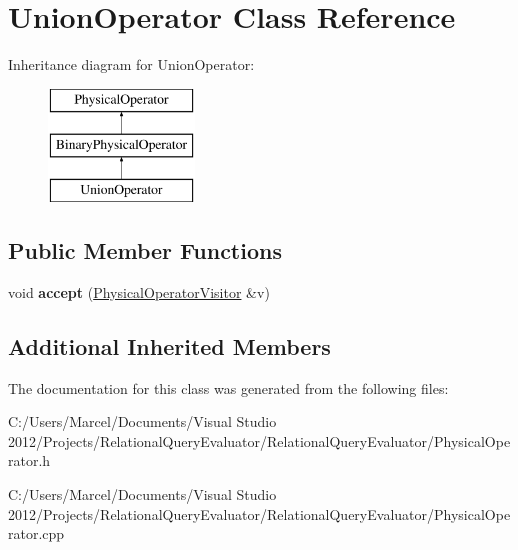 \hypertarget{class_union_operator}{\section{Union\+Operator Class Reference}
\label{class_union_operator}
}
Inheritance diagram for Union\+Operator\+:\begin{figure}[H]
\begin{center}
\leavevmode
\includegraphics[height=3.000000cm]{class_union_operator}
\end{center}
\end{figure}
\subsection*{Public Member Functions}
\begin{DoxyCompactItemize}
\item 
\hypertarget{class_union_operator_a534cf044caa5074d4a493edff1209e16}{void {\bfseries accept} (\hyperlink{class_physical_operator_visitor}{Physical\+Operator\+Visitor} \&v)}\label{class_union_operator_a534cf044caa5074d4a493edff1209e16}

\end{DoxyCompactItemize}
\subsection*{Additional Inherited Members}


The documentation for this class was generated from the following files\+:\begin{DoxyCompactItemize}
\item 
C\+:/\+Users/\+Marcel/\+Documents/\+Visual Studio 2012/\+Projects/\+Relational\+Query\+Evaluator/\+Relational\+Query\+Evaluator/Physical\+Operator.\+h\item 
C\+:/\+Users/\+Marcel/\+Documents/\+Visual Studio 2012/\+Projects/\+Relational\+Query\+Evaluator/\+Relational\+Query\+Evaluator/Physical\+Operator.\+cpp\end{DoxyCompactItemize}
